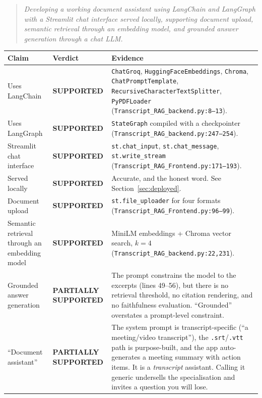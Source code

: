 \documentclass[11pt,a4paper]{article}
\newcommand{\SUP}{\textcolor{supported}{\textbf{SUPPORTED}}}
\newcommand{\PART}{\textcolor{partial}{\textbf{PARTIALLY SUPPORTED}}}
\begin{document}
\begin{quote}\itshape
Developing a working document assistant using LangChain and LangGraph with a
Streamlit chat interface served locally, supporting document upload, semantic
retrieval through an embedding model, and grounded answer generation through a
chat LLM.
\end{quote}

\begin{longtable}{@{}p{6.4cm}p{3.4cm}p{5.6cm}@{}}
\toprule
\textbf{Claim} & \textbf{Verdict} & \textbf{Evidence} \\
\midrule
\endhead
Uses LangChain & \SUP & \texttt{ChatGroq}, \texttt{HuggingFaceEmbeddings},
\texttt{Chroma}, \texttt{ChatPromptTemplate},
\texttt{RecursiveCharacterTextSplitter}, \texttt{PyPDFLoader}
(\texttt{Transcript\_RAG\_backend.py:8--13}). \\
\addlinespace
Uses LangGraph & \SUP & \texttt{StateGraph} compiled with a checkpointer
(\texttt{Transcript\_RAG\_backend.py:247--254}). \\
\addlinespace
Streamlit chat interface & \SUP & \texttt{st.chat\_input},
\texttt{st.chat\_message}, \texttt{st.write\_stream}
(\texttt{Transcript\_RAG\_Frontend.py:171--193}). \\
\addlinespace
Served locally & \SUP & Accurate, and the honest word. See
Section~\ref{sec:deployed}. \\
\addlinespace
Document upload & \SUP & \texttt{st.file\_uploader} for four formats
(\texttt{Transcript\_RAG\_Frontend.py:96--99}). \\
\addlinespace
Semantic retrieval through an embedding model & \SUP & MiniLM embeddings +
Chroma vector search, $k=4$ (\texttt{Transcript\_RAG\_backend.py:22,231}). \\
\addlinespace
Grounded answer generation & \PART & The prompt constrains the model to the
excerpts (lines 49--56), but there is no retrieval threshold, no citation
rendering, and no faithfulness evaluation. ``Grounded'' overstates a
prompt-level constraint. \\
\addlinespace
``Document assistant'' & \PART & The system prompt is transcript-specific
(``a meeting/video transcript''), the \texttt{.srt}/\texttt{.vtt} path is
purpose-built, and the app auto-generates a meeting summary with action items.
It is a \emph{transcript} assistant. Calling it generic undersells the
specialisation and invites a question you will lose. \\
\bottomrule
\end{longtable}
\end{document}
